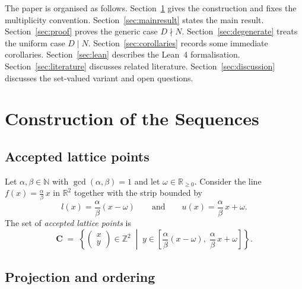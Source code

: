 \documentclass[11pt]{article}
\theoremstyle{plain}
\theoremstyle{definition}
\theoremstyle{remark}
\begin{document}
The paper is organised as follows.  Section~\ref{sec:setup} gives the
construction and fixes the multiplicity convention.
Section~\ref{sec:mainresult} states the main result.
Section~\ref{sec:proof} proves the generic case \(D \nmid N\).
Section~\ref{sec:degenerate} treats the uniform case \(D \mid N\).
Section~\ref{sec:corollaries} records some immediate corollaries.
Section~\ref{sec:lean} describes the Lean~4 formalisation.
Section~\ref{sec:literature} discusses related literature.
Section~\ref{sec:discussion} discusses the set-valued variant and open
questions.

\section{Construction of the Sequences}\label{sec:setup}

\subsection{Accepted lattice points}\label{subsec:construction}

Let \(\alpha, \beta \in \mathbb{N}\) with \(\gcd(\alpha, \beta) = 1\) and let
\(\omega \in \mathbb{R}_{\ge 0}\).
Consider the line \(f(x) = \frac{\alpha}{\beta}\,x\) in \(\mathbb{R}^2\)
together with the strip bounded by
\[
    l(x) = \frac{\alpha}{\beta}(x - \omega)
    \qquad\text{and}\qquad
    u(x) = \frac{\alpha}{\beta}\,x + \omega.
\]
The set of \emph{accepted lattice points} is
\begin{equation}\label{eq:points}
    \mathbf{C} \;=\; \left\{
    \begin{pmatrix} x \\ y \end{pmatrix} \in \mathbb{Z}^2
    \;\middle|\;
    y \in
    \left[\frac{\alpha}{\beta}(x - \omega),\;
          \frac{\alpha}{\beta}\,x + \omega\right]
    \right\}.
\end{equation}

\subsection{Projection and ordering}\label{subsec:projection}
\end{document}
